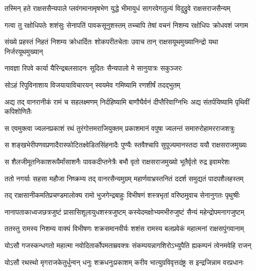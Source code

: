 
\twolineshloka
{तस्मिन् हते राक्षससैन्यपाले प्लवंगमानामृषभेण युद्धे}
{भीमायुधं सागरवेगतुल्यं विदुद्रुवे राक्षसराजसैन्यम्} %

\twolineshloka
{गत्वा तु रक्षोधिपतेः शशंसुः सेनापतिं पावकसूनुशस्तम्}
{तच्चापि तेषां वचनं निशम्य रक्षोधिपः क्रोधवशं जगाम} %

\twolineshloka
{संख्ये प्रहस्तं निहतं निशम्य क्रोधार्दितः शोकपरीतचेताः}
{उवाच तान् राक्षसयूथमुख्यानिन्द्रो यथा निर्जरयूथमुख्यान्} %

\twolineshloka
{नावज्ञा रिपवे कार्या यैरिन्द्रबलसादनः}
{सूदितः सैन्यपालो मे सानुयात्रः सकुञ्जरः} %

\twolineshloka
{सोऽहं रिपुविनाशाय विजयायाविचारयन्}
{स्वयमेव गमिष्यामि रणशीर्षं तदद्भुतम्} %

\threelineshloka
{अद्य तद् वानरानीकं रामं च सहलक्ष्मणम्}
{निर्दहिष्यामि बाणौघैर्वनं दीप्तैरिवाग्निभिः}
{अद्य संतर्पयिष्यामि पृथिवीं कपिशोणितैः} %

\twolineshloka
{स एवमुक्त्वा ज्वलनप्रकाशं रथं तुरंगोत्तमराजियुक्तम्}
{प्रकाशमानं वपुषा ज्वलन्तं समारुरोहामरराजशत्रुः} %

\twolineshloka
{स शङ्खभेरीपणवप्रणादैरास्फोटितक्ष्वेडितसिंहनादैः}
{पुण्यैः स्तवैश्चापि सुपूज्यमानस्तदा ययौ राक्षसराजमुख्यः} %

\twolineshloka
{स शैलजीमूतनिकाशरूपैर्मांसाशनैः पावकदीप्तनेत्रैः}
{बभौ वृतो राक्षसराजमुख्यो भूतैर्वृतो रुद्र इवामरेशः} %

\twolineshloka
{ततो नगर्याः सहसा महौजा निष्क्रम्य तद् वानरसैन्यमुग्रम्}
{महार्णवाभ्रस्तनितं ददर्श समुद्यतं पादपशैलहस्तम्} %

\twolineshloka
{तद् राक्षसानीकमतिप्रचण्डमालोक्य रामो भुजगेन्द्रबाहुः}
{विभीषणं शस्त्रभृतां वरिष्ठमुवाच सेनानुगतः पृथुश्रीः} %

\twolineshloka
{नानापताकाध्वजछत्रजुष्टं प्रासासिशूलायुधशस्त्रजुष्टम्}
{कस्येदमक्षोभ्यमभीरुजुष्टं सैन्यं महेन्द्रोपमनागजुष्टम्} %

\twolineshloka
{ततस्तु रामस्य निशम्य वाक्यं विभीषणः शक्रसमानवीर्यः}
{शशंस रामस्य बलप्रवेकं महात्मनां राक्षसपुंगवानाम्} %

\twolineshloka
{योऽसौ गजस्कन्धगतो महात्मा नवोदितार्कोपमताम्रवक्त्रः}
{संकम्पयन्नागशिरोऽभ्युपैति ह्यकम्पनं त्वेनमवेहि राजन्} %

\twolineshloka
{योऽसौ रथस्थो मृगराजकेतुर्धुन्वन् धनुः शक्रधनुःप्रकाशम्}
{करीव भात्युग्रविवृत्तदंष्ट्रः स इन्द्रजिन्नाम वरप्रधानः} %

